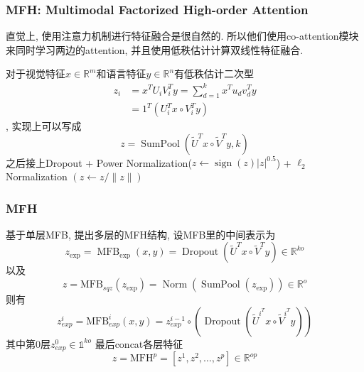 \documentclass{beamer}
\begin{document}
\begin{frame}
    \frametitle{MFH: Multimodal Factorized High-order Attention}

    直觉上, 使用注意力机制进行特征融合是很自然的. 所以他们使用co-attention模块来同时学习两边的attention, 并且使用低秩估计计算双线性特征融合.

    对于视觉特征$x \in \mathbb{R}^{m}$和语言特征$y \in \mathbb{R}^{n}$有低秩估计二次型
    \begin{equation}
        \begin{aligned}
        z_{i} &=x^{T} U_{i} V_{i}^{T} y=\sum_{d=1}^{k} x^{T} u_{d} v_{d}^{T} y \\
        &=1^{T}\left(U_{i}^{T} x \circ V_{i}^{T} y\right)
        \end{aligned}
    \end{equation},
    实现上可以写成
    \begin{equation}
        z=\operatorname{SumPool}\left(\tilde{U}^{T} x \circ \tilde{V}^{T} y, k\right)
    \end{equation}
    之后接上Dropout + Power Normalization($z \leftarrow \operatorname{sign}(z)|z|^{0.5}$) + $\ell_2$ Normalization $(z \leftarrow z /\|z\|)$

\end{frame}

\begin{frame}
    \frametitle{MFH}

    基于单层MFB, 提出多层的MFH结构, 设MFB里的中间表示为
    \begin{equation}
        z_{\exp }=\operatorname{MFB}_{\exp }(x, y)=\operatorname{Dropout}\left(\tilde{U}^{T} x \circ \tilde{V}^{T} y\right) \in \mathbb{R}^{k o}
    \end{equation}
    以及
    \begin{equation}
        z=\mathrm{MFB}_{s q z}\left(z_{\exp }\right)=\operatorname{Norm}\left(\operatorname{SumPool}\left(z_{\exp }\right)\right) \in \mathbb{R}^{o}
    \end{equation}
    则有
    \begin{equation}
        z_{e x p}^{i}=\mathrm{MFB}_{e x p}^{i}(x, y)=z_{e x p}^{i-1} \circ\left(\operatorname{Dropout}\left(\tilde{U}^{i^{T}} x \circ \tilde{V}^{i^{T}} y\right)\right)
    \end{equation}
    其中第0层$z_{e x p}^{0} \in \mathbb{1}^{k o}$   
    最后concat各层特征  
    \begin{equation}
        z=\mathrm{MFH}^{p}=\left[z^{1}, z^{2}, \ldots, z^{p}\right] \in \mathbb{R}^{o p}
    \end{equation}

\end{frame}
\end{document}

